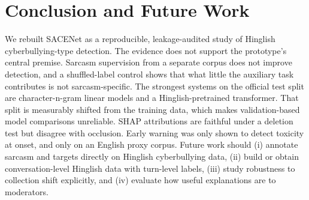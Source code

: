 \documentclass[10pt,twocolumn]{article}
\begin{document}
\section{Conclusion and Future Work}

We rebuilt SACENet as a reproducible, leakage-audited study of Hinglish cyberbullying-type detection. The evidence does not
support the prototype's central premise. Sarcasm supervision from a separate corpus does not improve detection, and a
shuffled-label control shows that what little the auxiliary task contributes is not sarcasm-specific. The strongest systems on
the official test split are character-n-gram linear models and a Hinglish-pretrained transformer. That split is measurably
shifted from the training data, which makes validation-based model comparisons unreliable. SHAP attributions are faithful
under a deletion test but disagree with occlusion. Early warning was only shown to detect toxicity at onset, and only on an
English proxy corpus. Future work should (i) annotate sarcasm and targets directly on Hinglish cyberbullying data, (ii) build
or obtain conversation-level Hinglish data with turn-level labels, (iii) study robustness to collection shift explicitly, and
(iv) evaluate how useful explanations are to moderators.



\end{document}
